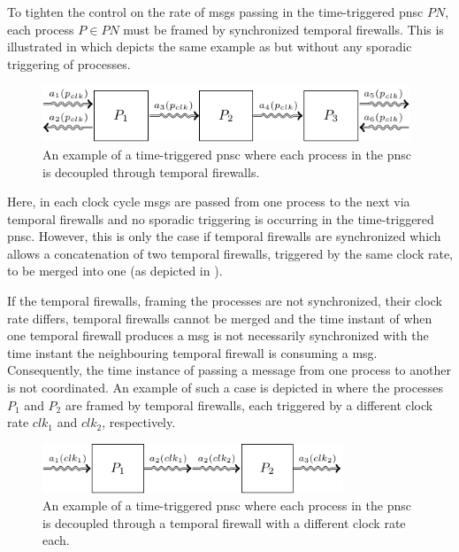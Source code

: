To tighten the control on the rate of \glspl*{msg} passing in the time-triggered \gls{pnsc} $\mathit{PN}$, each process $P \in \mathit{PN}$ must be framed by synchronized temporal firewalls.
This is illustrated in \Fig{\ref{fig_tcm_ttnw}} which depicts the same example as \Fig{\ref{fig_tcm_tfnw}} but without any sporadic triggering of processes.
\begin{figure}[bht]\begin{center}
\TopFigSpace
    \centering
    \includegraphics[width=11cm]{fig/procs_tt.pdf}
    \CaptionFigSpace
    \caption{An example of a time-triggered \gls{pnsc} where each process in the \gls{pnsc} is decoupled through temporal firewalls.}
    \label{fig_tcm_ttnw}
\BotFigSpace
\end{center}\end{figure}
Here, in each clock cycle \glspl*{msg} are passed from one process to the next via temporal firewalls and no sporadic triggering is occurring in the time-triggered \gls{pnsc}.
However, this is only the case if temporal firewalls are synchronized which allows a concatenation of two temporal firewalls, triggered by the same clock rate, to be merged into one (as depicted in \Fig{\ref{fig_tcm_ttnw}}).

If the temporal firewalls, framing the processes are not synchronized, \ie their clock rate differs, temporal firewalls cannot be merged and the time instant of when one temporal firewall produces a \gls*{msg} is not necessarily synchronized with the time instant the neighbouring temporal firewall is consuming a \gls*{msg}.
Consequently, the time instance of passing a message from one process to another is not coordinated.
An example of such a case is depicted in \Fig{\ref{fig_tcm_ttnw_async}} where the processes $P_1$ and $P_2$ are framed by temporal firewalls, each triggered by a different clock rate $clk_1$ and $clk_2$, respectively.
\begin{figure}[bht]\begin{center}
\TopFigSpace
    \centering
    \includegraphics[width=9cm]{fig/procs_tt_async.pdf}
    \CaptionFigSpace
    \caption{An example of a time-triggered \gls{pnsc} where each process in the \gls{pnsc} is decoupled through a temporal firewall with a different clock rate each.}
    \label{fig_tcm_ttnw_async}
\BotFigSpace
\end{center}\end{figure}

